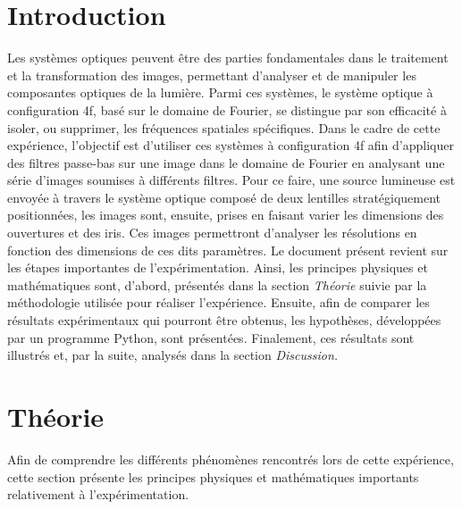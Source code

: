 \documentclass[11pt,letterpaper]{article}
\begin{document}
\section{Introduction}
Les systèmes optiques peuvent être des parties fondamentales dans le traitement et la transformation des images, permettant d'analyser et de manipuler les composantes optiques de la lumière. Parmi ces systèmes, le système optique à configuration 4f, basé sur le domaine de Fourier, se distingue par son efficacité à isoler, ou supprimer, les fréquences spatiales spécifiques. Dans le cadre de cette expérience, l'objectif est d'utiliser ces systèmes à configuration 4f afin d'appliquer des filtres passe-bas sur une image dans le domaine de Fourier en analysant une série d'images soumises à différents filtres. Pour ce faire, une source lumineuse est envoyée à travers le système optique composé de deux lentilles stratégiquement positionnées, les images sont, ensuite, prises en faisant varier les dimensions des ouvertures et des iris. Ces images permettront d'analyser les résolutions en fonction des dimensions de ces dits paramètres. Le document présent revient sur les étapes importantes de l'expérimentation. Ainsi, les principes physiques et mathématiques sont, d'abord, présentés dans la section \textit{Théorie} suivie par la méthodologie utilisée pour réaliser l'expérience. Ensuite, afin de comparer les résultats expérimentaux qui pourront être obtenus, les hypothèses, développées par un programme Python, sont présentées. Finalement, ces résultats sont illustrés et, par la suite, analysés dans la section \textit{Discussion.}

\section{Théorie}
Afin de comprendre les différents phénomènes rencontrés lors de cette expérience, cette section présente les principes physiques et mathématiques importants relativement à l'expérimentation.
\end{document}
